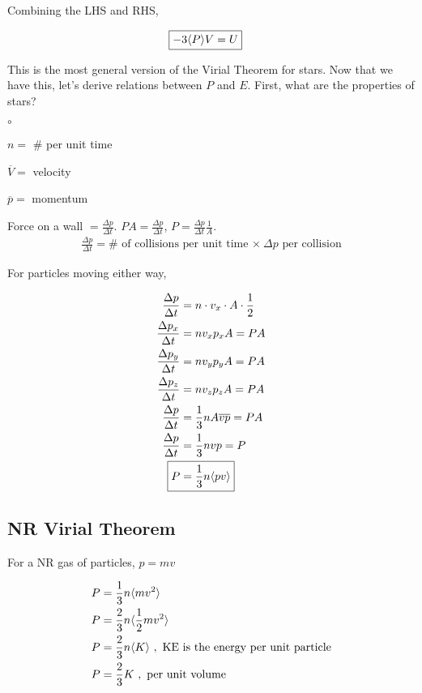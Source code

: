 Combining the LHS and RHS, 

\begin{align}
\Aboxed{-3\langle P\rangle V &= U}
\end{align}

This is the most general version of the Virial Theorem for stars. Now that we have this, let's derive relations between $P$ and $E$. First, what are the properties of stars?

\begin{list}{$\circ$}{}
\item $n=$ \# per unit time
\item $\overline{V}=$ velocity
\item $\overline{p} =$ momentum
\end{list}

Force on a wall $= \frac{\Delta p}{\Delta t}$. $PA = \frac{\Delta p}{\Delta t}$, $P = \frac{\Delta p}{\Delta t}\frac{1}{A}$.\\

\begin{align}
\frac{\Delta p}{\Delta t} = \# \text{ of collisions per unit time $\times~ \Delta p$ per collision}
\end{align}

For particles moving either way, 

\begin{align}
\frac{\Delta p}{\Delta t} &= n\cdot v_x \cdot A \cdot \half\\
\frac{\Delta p_x}{\Delta t} &= nv_xp_xA = PA\\
\frac{\Delta p_y}{\Delta t} &= nv_yp_yA = PA\\
\frac{\Delta p_z}{\Delta t} &= nv_zp_zA = PA\\
\frac{\Delta p}{\Delta t} &=\frac{1}{3}nA\overline{v}\overline{p} = PA\\
\frac{\Delta p}{\Delta t} &=\frac{1}{3}nvp = P\\
\Aboxed{P &= \frac{1}{3}n\langle pv\rangle}
\end{align}

\subsection{NR Virial Theorem}

For a NR gas of particles, $p=mv$

\begin{align}
P &= \frac{1}{3}n\langle mv^2\rangle\\
P &= \frac{2}{3}n\langle \frac{1}{2} mv^2\rangle \\
P &= \frac{2}{3}n\langle K\rangle ~,\text{ KE is the energy per unit particle}\\
P &= \frac{2}{3}K~,\text{ per unit volume}
\end{align}

